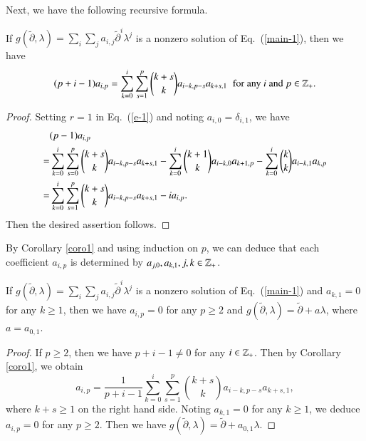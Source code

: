 \documentclass[12pt]{amsart}
\begin{document}
Next, we have the following recursive formula.
\begin{cor}\label{coro1}
If $g(\widetilde{\partial}, \lambda)=\sum_i\sum_j a_{i,j}\widetilde{\partial}^i \lambda^j$ is a nonzero solution of Eq.~(\ref{main-1}), then we have
\begin{equation}
(p+i-1)a_{i,p}
=\sum_{k=0}^i\sum_{s=1}^p\binom{k+s}{k}a_{i-k,p-s}a_{k+s,1}\;\;\text{for any $i$ and $p\in \mathbb{Z}_+$.}
\end{equation}
\end{cor}
\begin{proof}
Setting $r=1$ in Eq.~(\ref{e-1}) and noting $a_{i,0}=\delta_{i,1}$, we have
\begin{equation*}
\aligned
&(p-1)a_{i,p}\\
=&\sum_{k=0}^i\sum_{s=0}^p\binom{k+s}{k}a_{i-k,p-s}a_{k+s,1}-
\sum_{k=0}^i\binom{k+1}{k}a_{i-k, 0}a_{k+1,p}-
\sum_{k=0}^i\binom{k}{k}a_{i-k,1}a_{k,p}\\
=&\sum_{k=0}^i\sum_{s=1}^p\binom{k+s}{k}a_{i-k,p-s}a_{k+s, 1}-
ia_{i,p}.
\endaligned
\end{equation*}
Then the desired assertion follows.\end{proof}

\begin{rmk}
By Corollary \ref{coro1} and using induction on $p$, we can deduce
that each coefficient
$a_{i,p}$ is determined by $a_{j,0}, a_{k,1}, j,k\in\mathbb{Z}_+$.
\end{rmk}

\begin{cor}\label{coro2}
If $g(\widetilde{\partial}, \lambda)=\sum_i\sum_j a_{i,j}\widetilde{\partial}^i \lambda^j$ is a nonzero solution of Eq.~(\ref{main-1}) and $a_{k,1}=0$ for any $k\geq 1$, then we have
$a_{i,p}=0$ for any $p\geq 2$ and $g(\widetilde{\partial}, \lambda)=\widetilde{\partial}+a\lambda$, where $a=a_{0,1}$.
\end{cor}
\begin{proof}
If $p\geq 2$, then we have $p+i-1\neq 0$ for any $i\in \mathbb{Z}_+$.
Then by Corollary \ref{coro1}, we obtain
\begin{equation}
a_{i,p}
=\frac{1}{p+i-1}\sum_{k=0}^i\sum_{s=1}^p\binom{k+s}{k}a_{i-k,p-s}a_{k+s,1},
\end{equation}
where $k+s\geq 1$ on the right hand side.
Noting $a_{k,1}=0$ for any $k\geq 1$, we deduce $a_{i,p}=0$ for any $p\geq 2$.
Then we have $g(\widetilde{\partial}, \lambda)=\widetilde{\partial}+a_{0,1}\lambda$.
\end{proof}
\end{document}
